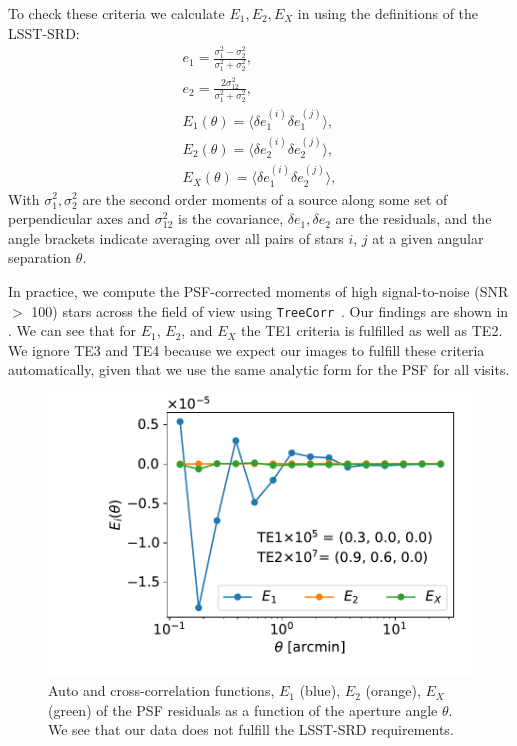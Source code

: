 \documentclass[twocolumn]{aastex62}
\begin{document}
To check these criteria we calculate $E_{1}, E_{2}, E_{X}$ in using the definitions of the LSST-SRD:
\begin{eqnarray}
e_{1} = \frac{\sigma^{2}_{1} - \sigma^{2}_{2}}{\sigma_{1}^{2}+\sigma_{2}^{2}},\\
e_{2} = \frac{2\sigma^{2}_{12}}{\sigma_{1}^{2}+\sigma_{2}^{2}},\\
E_{1} (\theta) = \langle \delta e^{(i)}_{1}\delta e^{(j)}_{1} \rangle,\\
E_{2} (\theta) = \langle \delta e^{(i)}_{2}\delta e^{(j)}_{2} \rangle,\\
E_{X} (\theta) = \langle \delta e^{(i)}_{1}\delta e^{(j)}_{2} \rangle,
\end{eqnarray}
With $\sigma_{1}^{2}, \sigma_{2}^{2}$ are the second order moments of a source along some set of perpendicular axes and $\sigma^{2}_{12}$ is the covariance, $\delta e_{1}, \delta e_{2}$ are the residuals, and the angle brackets indicate averaging over all pairs of stars $i$, $j$ at a given angular separation $\theta$.

In practice, we compute the PSF-corrected moments of high signal-to-noise (SNR $>$ 100) stars across the field of view using \texttt{TreeCorr}~\citep{2004MNRAS.352..338J}. Our findings are shown in . We can see that for $E_{1}$, $E_{2}$, and $E_{X}$ the TE1 criteria is fulfilled as well as TE2. We ignore TE3 and TE4 because we expect our images to fulfill these criteria automatically, given that we use the same analytic form for the PSF for all visits. 

\begin{figure}
\centering
\includegraphics[width=0.9\columnwidth]{TEx}
\caption{Auto and cross-correlation functions, $E_{1}$ (blue), $E_{2}$ (orange), $E_{X}$ (green) of the PSF residuals as a function of the aperture angle $\theta$. We see that our data does not fulfill the LSST-SRD requirements.}
\label{fig:TEx}
\end{figure}
\end{document}
